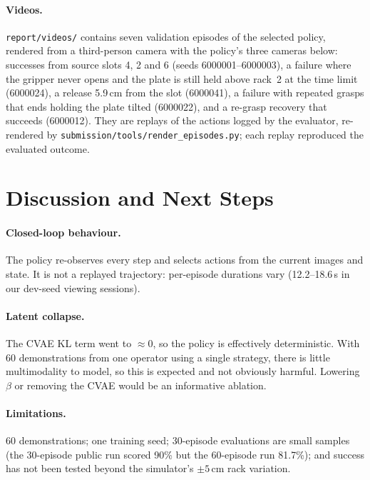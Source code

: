 \documentclass[11pt,a4paper]{article}
\begin{document}
\paragraph{Videos.} \texttt{report/videos/} contains seven validation
episodes of the selected policy, rendered from a third-person camera with the
policy's three cameras below: successes from source slots 4, 2 and 6 (seeds
6000001--6000003), a failure where the gripper never opens and the plate is
still held above rack~2 at the time limit (6000024), a release 5.9\,cm from
the slot (6000041), a failure with repeated grasps that ends holding the
plate tilted (6000022), and a re-grasp recovery that succeeds (6000012). They are replays of the actions logged by the
evaluator, re-rendered by \texttt{submission/tools/render\_episodes.py}; each
replay reproduced the evaluated outcome.

\section{Discussion and Next Steps}
\label{sec:discussion}

\paragraph{Closed-loop behaviour.} The policy re-observes every step and
selects actions from the current images and state. It is not a replayed
trajectory: per-episode durations vary (12.2--18.6\,s in our dev-seed
viewing sessions).
\paragraph{Latent collapse.} The CVAE KL term went to $\approx 0$, so the
policy is effectively deterministic. With 60 demonstrations from one operator using a single
strategy, there is little multimodality to model, so this is expected and not
obviously harmful. Lowering $\beta$ or removing the CVAE would be an
informative ablation.

\paragraph{Limitations.} 60 demonstrations; one training seed; 30-episode
evaluations are small samples (the 30-episode public run scored 90\% but the 60-episode run 81.7\%); and success has not been tested
beyond the simulator's $\pm5$\,cm rack variation.
\end{document}
